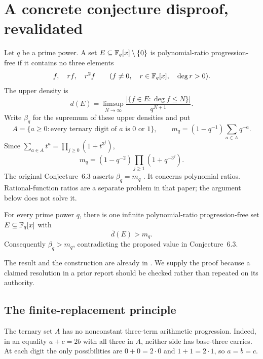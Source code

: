\section{A concrete conjecture disproof, revalidated}\label{sec:density}

Let \(q\) be a prime power. A set \(E\subseteq\mathbb F_q[x]\setminus\{0\}\)
is polynomial-ratio progression-free if it contains no three elements
\[
 f,\quad rf,\quad r^2f
 \qquad(f\ne0,\quad r\in\mathbb F_q[x],\quad \deg r>0).
\]
The upper density is
\[
 \overline d(E)=\limsup_{N\to\infty}
       \frac{|\{f\in E:\deg f\le N\}|}{q^{N+1}}.
\]
Write \(\beta_q\) for the supremum of these upper densities and put
\[
 A=\{a\ge0:\text{every ternary digit of }a\text{ is }0\text{ or }1\},
 \qquad
 m_q=(1-q^{-1})\sum_{a\in A}q^{-a}.
\]
Since \(\sum_{a\in A}t^a=\prod_{j\ge0}(1+t^{3^j})\),
\begin{equation}\label{eq:mq}
 m_q=(1-q^{-2})\prod_{j\ge1}(1+q^{-3^j}).
\end{equation}
The original Conjecture~6.3 asserts \(\beta_q=m_q\)
\cite{asada}. It concerns polynomial ratios. Rational-function ratios are
a separate problem in that paper; the argument below does not solve it.

\begin{theorem}\label{th:density}
For every prime power \(q\), there is one infinite polynomial-ratio
progression-free set \(E\subseteq\mathbb F_q[x]\) with
\[
 \overline d(E)>m_q.
\]
Consequently \(\beta_q>m_q\), contradicting the proposed value in
Conjecture~6.3.
\end{theorem}

The result and the construction are already in
 \cite{priorDensity}.
We supply the proof because a claimed resolution in a prior report should
be checked rather than repeated on its authority.

\subsection{The finite-replacement principle}

The ternary set \(A\) has no nonconstant three-term arithmetic progression.
Indeed, in an equality \(a+c=2b\) with all three in \(A\), neither side
has base-three carries. At each digit the only possibilities are
\(0+0=2\cdot0\) and \(1+1=2\cdot1\), so \(a=b=c\).

